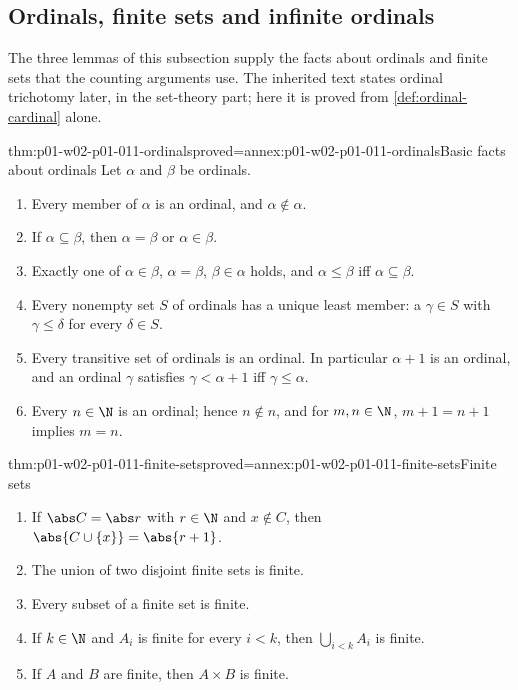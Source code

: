 \subsection{Ordinals, finite sets and infinite ordinals}
\label{sec:p01-w02-p01-011-basic}

The three lemmas of this subsection supply the facts about ordinals and
finite sets that the counting arguments use. The inherited text states
ordinal trichotomy later, in the set-theory part; here it is proved from
\cref{def:ordinal-cardinal} alone.

\begin{hblemma}{thm:p01-w02-p01-011-ordinals}{proved=annex:p01-w02-p01-011-ordinals}{Basic facts about ordinals}
Let \(\alpha\) and \(\beta\) be ordinals.
\begin{enumerate}
  \item Every member of \(\alpha\) is an ordinal, and \(\alpha\notin\alpha\).
  \item If \(\alpha\subseteq\beta\), then \(\alpha=\beta\) or
        \(\alpha\in\beta\).
  \item Exactly one of \(\alpha\in\beta\), \(\alpha=\beta\),
        \(\beta\in\alpha\) holds, and \(\alpha\leq\beta\) iff
        \(\alpha\subseteq\beta\).
  \item Every nonempty set \(S\) of ordinals has a unique least member: a
        \(\gamma\in S\) with \(\gamma\leq\delta\) for every \(\delta\in S\).
  \item Every transitive set of ordinals is an ordinal. In particular
        \(\alpha+1\) is an ordinal, and an ordinal \(\gamma\) satisfies
        \(\gamma<\alpha+1\) iff \(\gamma\leq\alpha\).
  \item Every \(n\in\N\) is an ordinal; hence \(n\notin n\), and for
        \(m,n\in\N\), \(m+1=n+1\) implies \(m=n\).
\end{enumerate}
\end{hblemma}

\begin{hblemma}{thm:p01-w02-p01-011-finite-sets}{proved=annex:p01-w02-p01-011-finite-sets}{Finite sets}
\begin{enumerate}
  \item If \(\abs C=\abs r\) with \(r\in\N\) and \(x\notin C\), then
        \(\abs{C\cup\{x\}}=\abs{r+1}\).
  \item The union of two disjoint finite sets is finite.
  \item Every subset of a finite set is finite.
  \item If \(k\in\N\) and \(A_i\) is finite for every \(i<k\), then
        \(\bigcup_{i<k}A_i\) is finite.
  \item If \(A\) and \(B\) are finite, then \(A\times B\) is finite.
\end{enumerate}
\end{hblemma}

